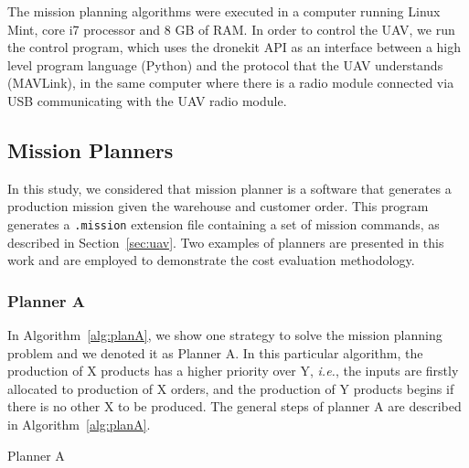 \documentclass[conference,harvard,brazil,english]{sbatex}
\begin{document}
The mission planning algorithms were executed in a computer running Linux Mint, core i7 processor and 8 GB of RAM. In order to control the UAV, we run the control program, which uses the dronekit API as an interface between a high level program language (Python) and the protocol that the UAV understands (MAVLink), in the same computer where there is a radio module connected via USB communicating with the UAV radio module.

\subsection{Mission Planners}

In this study, we considered that mission planner is a software that generates a production mission given the warehouse and customer order. This program generates a \texttt{.mission} extension file containing a set of mission commands, as described in Section~\ref{sec:uav}. Two examples of planners are presented in this work and are employed to demonstrate the cost evaluation methodology.

\subsubsection{Planner A}

In Algorithm~\ref{alg:planA}, we show one strategy to solve the mission planning problem and we denoted it as Planner A. In this particular algorithm, the production of X products has a higher priority over Y, {\it i.e.}, the inputs are firstly allocated to production of X orders, and the production of Y products begins if there is no other X to be produced. The general steps of planner A are described in Algorithm~\ref{alg:planA}.
%
\begin{algorithm}[ht]
\footnotesize
{}
\captionsetup{list=no}
\caption{Planner A}\label{alg:planA}
\end{algorithm}
\end{document}
